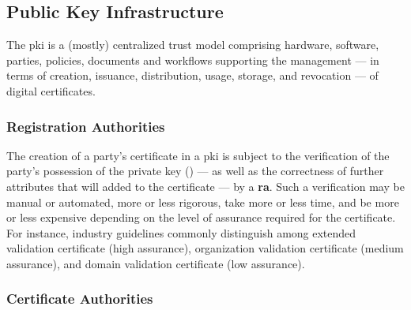 \subsection{Public Key Infrastructure}\label{sec:binding_keys_to_parties:pki}

The \gls{pki} is a (mostly) centralized trust model comprising hardware, software, parties, policies, documents and workflows supporting the management --- in terms of creation, issuance, distribution, usage, storage, and revocation --- of digital certificates.


\subsubsection{Registration Authorities}\label{sec:binding_keys_to_parties:pki:ra}

The creation of a party's certificate in a \gls{pki} is subject to the verification of the party's possession of the private key () --- as well as the correctness of further attributes that will added to the certificate --- by a \textbf{\gls{ra}}. Such a verification may be manual or automated, more or less rigorous, take more or less time, and be more or less expensive depending on the level of assurance required for the certificate. For instance, industry guidelines commonly distinguish among extended validation certificate (high assurance), organization validation certificate (medium assurance), and domain validation certificate (low assurance).


\subsubsection{Certificate Authorities}\label{sec:binding_keys_to_parties:pki:ca}


